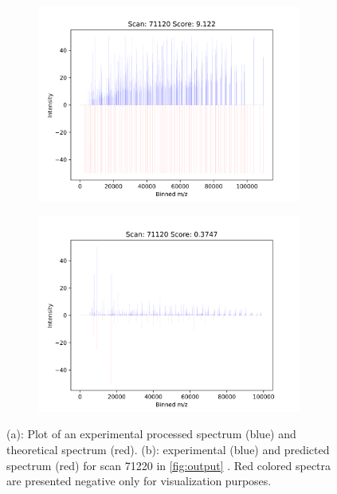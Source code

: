 \documentclass[11pt]{article}
\begin{document}
\begin{figure}
\centering
\begin{subfigure}[b]{1\textwidth}
    \includegraphics[width=0.95\textwidth]{figs/scan_71120_ps=False.png}
   \caption{}
   \label{fig:theo} 
\end{subfigure}
\begin{subfigure}[b]{1\textwidth}
   \includegraphics[width=0.95\textwidth]{figs/scan_71120_ps=True.png}
   \caption{}
   \label{fig:predict}
\end{subfigure}

\caption{(a): Plot of an experimental processed spectrum (blue) and theoretical spectrum (red). (b): experimental (blue) and predicted spectrum (red) for scan 71220 in \cref{fig:output} . Red colored spectra are presented negative only for visualization purposes.}
\label{predandtheo}
\end{figure}
\end{document}
